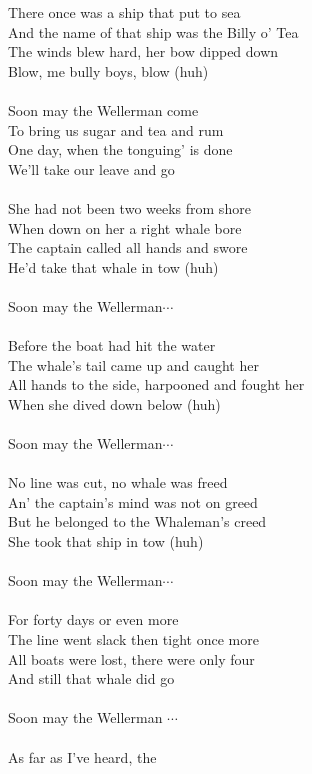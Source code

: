 
There once was a ship that put to sea \\ And the name of that ship was the Billy o' Tea \\ The winds blew hard, her bow dipped down \\ Blow, me bully boys, blow (huh) \\ \hspace{10mm} \\ Soon may the Wellerman come \\ To bring us sugar and tea and rum \\ One day, when the tonguing' is done \\ We'll take our leave and go \\ \hspace{10mm} \\ She had not been two weeks from shore \\ When down on her a right whale bore \\ The captain called all hands and swore \\ He'd take that whale in tow (huh) \\ \hspace{10mm} \\ Soon may the Wellerman$\cdots$ \\ \hspace{10mm} \\ Before the boat had hit the water \\ The whale's tail came up and caught her \\ All hands to the side, harpooned and fought her \\ When she dived down below (huh) \\ \hspace{10mm} \\ Soon may the Wellerman$\cdots$ \\ \hspace{10mm} \\ No line was cut, no whale was freed \\ An' the captain's mind was not on greed \\ But he belonged to the Whaleman's creed \\ She took that ship in tow (huh) \\ \hspace{10mm} \\ Soon may the Wellerman$\cdots$ \\ \hspace{10mm} \\ For forty days or even more \\ The line went slack then tight once more \\ All boats were lost, there were only four \\ And still that whale did go \\ \hspace{10mm} \\ Soon may the Wellerman $\cdots$ \\ \hspace{10mm} \\ As far as I've heard, the 